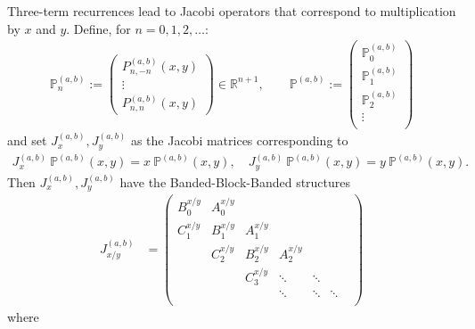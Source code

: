 \documentclass[11pt, oneside]{article}   	%
\newcommand{\R}{\mathbb{R}}
\newcommand{\bigP}{\mathbb{P}}
\newcommand{\bigPab}{\bigP^{(a,b)}}
\begin{document}
Three-term recurrences lead to Jacobi operators that correspond to multiplication by $x$ and $y$. Define, for $n=0,1,2,\dots$: 
\begin{align}
\bigPab_n := \begin{pmatrix}
		P^{(a,b)}_{n,-n}(x,y) \\
		\vdots \\
		P^{(a,b)}_{n,n}(x,y)
	\end{pmatrix} \in \R^{n+1}, 
\quad \quad 
\bigPab := \begin{pmatrix}
		\bigPab_0 \\
		\bigPab_1 \\
		\bigPab_2 \\
		\vdots \\
	\end{pmatrix}
\end{align}
and set $J_x^{(a,b)}, J_y^{(a,b)}$ as the Jacobi matrices corresponding to
\begin{align}
J_x^{(a,b)} \: \bigPab(x,y) = x \: \bigPab(x,y), \quad J_y^{(a,b)} \: \bigPab(x,y) = y \: \bigPab(x,y).
\end{align}
Then $J_x^{(a,b)}, J_y^{(a,b)}$ have the Banded-Block-Banded structures
\begin{align}
J_{x/y}^{(a,b)} &= \begin{pmatrix}
		B^{x/y}_0 & A^{x/y}_0 & & & & \\
		C^{x/y}_1 & B^{x/y}_1 & A^{x/y}_1 & & & \\
		& C^{x/y}_2 & B^{x/y}_2 & A^{x/y}_2  & & & \\
		& & C^{x/y}_3 & \ddots & \ddots & \\
		& & & \ddots & \ddots & \ddots \\
	\end{pmatrix}
\end{align}
where
\end{document}
